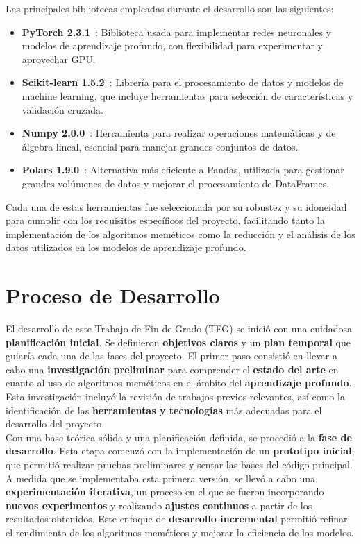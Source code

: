 Las principales bibliotecas empleadas durante el desarrollo son las siguientes:
\begin{itemize}
    \item \textbf{PyTorch 2.3.1}~\cite{}: Biblioteca usada para implementar redes neuronales y modelos de aprendizaje
profundo, con flexibilidad para experimentar y aprovechar GPU\@.
    \item \textbf{Scikit-learn 1.5.2}~\cite{}: Librería para el procesamiento de datos y modelos de machine learning,
que incluye herramientas para selección de características y validación cruzada.
    \item \textbf{Numpy 2.0.0}~\cite{}: Herramienta para realizar operaciones matemáticas y de álgebra lineal, esencial
para manejar grandes conjuntos de datos.
    \item \textbf{Polars 1.9.0}~\cite{}: Alternativa más eficiente a Pandas, utilizada para gestionar grandes volúmenes
de datos y mejorar el procesamiento de DataFrames.
\end{itemize}

Cada una de estas herramientas fue seleccionada por su robustez y su idoneidad para cumplir con los requisitos
específicos del proyecto, facilitando tanto la implementación de los algoritmos meméticos como la reducción y el
análisis de los datos utilizados en los modelos de aprendizaje profundo. \\[6pt]

\section{Proceso de Desarrollo}\label{sec:proceso-de-desarrollo}
El desarrollo de este Trabajo de Fin de Grado (TFG) se inició con una cuidadosa \textbf{planificación inicial}.
Se definieron \textbf{objetivos claros} y un \textbf{plan temporal} que guiaría cada una de las fases del proyecto.
El primer paso consistió en llevar a cabo una \textbf{investigación preliminar} para comprender el
\textbf{estado del arte} en cuanto al uso de algoritmos meméticos en el ámbito del \textbf{aprendizaje profundo}.
Esta investigación incluyó la revisión de trabajos previos relevantes, así como la identificación de las
\textbf{herramientas y tecnologías} más adecuadas para el desarrollo del proyecto. \\[6pt]

Con una base teórica sólida y una planificación definida, se procedió a la \textbf{fase de desarrollo}.
Esta etapa comenzó con la implementación de un \textbf{prototipo inicial}, que permitió realizar pruebas preliminares y
sentar las bases del código principal.
A medida que se implementaba esta primera versión, se llevó a cabo una \textbf{experimentación iterativa}, un proceso
en el que se fueron incorporando \textbf{nuevos experimentos} y realizando \textbf{ajustes continuos} a partir de los
resultados obtenidos.
Este enfoque de \textbf{desarrollo incremental} permitió refinar el rendimiento de los algoritmos meméticos y mejorar la
eficiencia de los modelos. \\[6pt]

